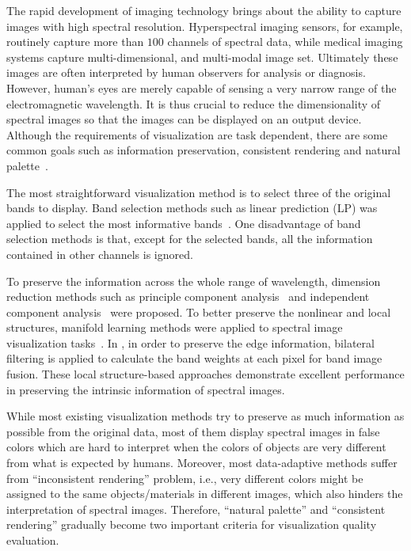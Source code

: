 \documentclass[10pt,conference,a4paper]{IEEEtran}
\begin{document}
The rapid development of imaging technology brings about the ability to capture images with high spectral resolution.
Hyperspectral imaging sensors, for example, routinely capture more than $100$ channels of spectral data, while medical imaging systems capture multi-dimensional, and multi-modal image set.
Ultimately these images are often interpreted by human observers for analysis or diagnosis.
However, human's eyes are merely capable of sensing a very narrow range of the electromagnetic wavelength.
It is thus crucial to reduce the dimensionality of spectral images so that the images can be displayed on an output device.
Although the requirements of visualization are task dependent, there are some common goals such as information preservation, consistent rendering and natural palette~\cite{jacobson2005design}.

The most straightforward visualization method is to select three of the original bands to display.
Band selection methods such as
linear prediction (LP) was applied to select the most informative bands~\cite{su2014LP}.
One disadvantage of band selection methods is that, except for the selected bands, all the information contained in other channels is ignored.

To preserve the information across the whole range of wavelength, dimension reduction methods such as principle component analysis~\cite{tyo2003principal} and independent component analysis~\cite{zhu2007evaluation} were proposed.
To better preserve the nonlinear and local structures, manifold learning methods were applied to spectral image visualization tasks~\cite{bachmann2005exploiting}.%
In \cite{kotwal2010visualization}, in order to preserve the edge information, bilateral filtering is applied to calculate the band weights at each pixel for band image fusion.
These local structure-based approaches demonstrate excellent performance in preserving the intrinsic information of spectral images.

While most existing visualization methods try to preserve as much information as possible from the original data,
most of them display spectral images in false colors which are hard to interpret when the colors of objects are very different from what is expected by humans.
Moreover, most data-adaptive methods suffer from ``inconsistent rendering'' problem, i.e., very different colors might be assigned to the same objects/materials in different images, which also hinders the interpretation of spectral images.
Therefore, ``natural palette'' and ``consistent rendering'' gradually become two important criteria for visualization quality evaluation.
\end{document}

